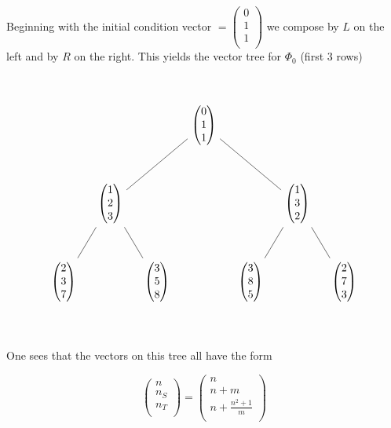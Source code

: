 \documentclass{article}
\begin{document}
Beginning with the initial condition vector $
= \begin{pmatrix}
0 \\
1 \\
1 \\
\end{pmatrix}$ we compose by $L$ on the left and by $R$ on the right. This yields the vector tree for $\Phi_0$ (first $3$ rows)

\

$$\begin{tikzpicture}[level distance=2.5cm,
  level 1/.style={sibling distance=6cm},
  level 2/.style={sibling distance=3cm}]
  \node {$\begin{pmatrix} 0 \\ 1 \\ 1 \end{pmatrix}$}
    child {node {$\begin{pmatrix} 1 \\ 2 \\ 3 \end{pmatrix}$}
      child {node {$\begin{pmatrix} 2 \\ 3 \\ 7 \end{pmatrix}$}}
      child {node {$\begin{pmatrix} 3 \\ 5 \\ 8 \end{pmatrix}$}}
    }
    child {node {$\begin{pmatrix} 1 \\ 3 \\ 2 \end{pmatrix}$}
      child {node {$\begin{pmatrix} 3 \\ 8 \\ 5 \end{pmatrix}$}}
      child {node {$\begin{pmatrix} 2 \\ 7 \\ 3 \end{pmatrix}$}}
    };
\end{tikzpicture}$$

\

One sees that the vectors on this tree all have the form

$$\begin{pmatrix}
n \\
n_S \\ 
n_T \\
\end{pmatrix} = \begin{pmatrix}
n \\
n+m \\ 
n + \frac{n^2+1}{m}  \\
\end{pmatrix}$$
\end{document}
